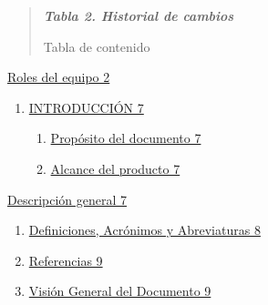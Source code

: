 \documentclass[
]{article}
\begin{document}
\begin{quote}
\protect{}\label{_bookmark2}{}\emph{\textbf{Tabla 2.
Historial de cambios}}

Tabla de contenido
\end{quote}

\hyperref[roles-del-equipo]{Roles del equipo 2}

\begin{enumerate}
\def\labelenumi{\arabic{enumi}.}
\item
  \hyperref[introducciuxf3n]{INTRODUCCIÓN 7}

  \begin{enumerate}
  \def\labelenumii{\arabic{enumii}.}
  \item
    \hyperref[propuxf3sito-del-documento]{Propósito del documento 7}
  \item
    \hyperref[alcance-del-producto]{Alcance del producto 7}
  \end{enumerate}
\end{enumerate}

\hyperref[descripciuxf3n-general]{Descripción general 7}

\begin{enumerate}
\def\labelenumi{\arabic{enumi}.}
\setcounter{enumi}{2}
\item
  \hyperref[definiciones-acruxf3nimos-y-abreviaturas]{Definiciones,
  Acrónimos y Abreviaturas 8}
\item
  \hyperref[referencias]{Referencias 9}
\item
  \hyperref[visiuxf3n-general-del-documento]{Visión General del
  Documento 9}
\end{enumerate}
\end{document}
